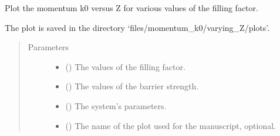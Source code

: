 \documentclass[letterpaper,10pt,english]{sphinxmanual}
\begin{document}

\begin{fulllineitems}
\label{\detokenize{modules:modules.utils.plot_k0_vs_Z_various_fillings}}
\pysigstartsignatures
{}
\pysigstopsignatures
\sphinxAtStartPar
Plot the momentum k0 versus Z for various values of the filling factor.

\sphinxAtStartPar
The plot is saved in the directory ‘files/momentum\_k0/varying\_Z/plots’.
\begin{quote}\begin{description}
\item[{Parameters}] \leavevmode\begin{itemize}
\item {} 
\sphinxAtStartPar
{} () \textendash{} The values of the filling factor.

\item {} 
\sphinxAtStartPar
{} () \textendash{} The values of the barrier strength.

\item {} 
\sphinxAtStartPar
{} () \textendash{} The system’s parameters.

\item {} 
\sphinxAtStartPar
{} () \textendash{} The name of the plot used for the manuscript, optional.

\end{itemize}

\end{description}\end{quote}

\end{fulllineitems}

\end{document}
